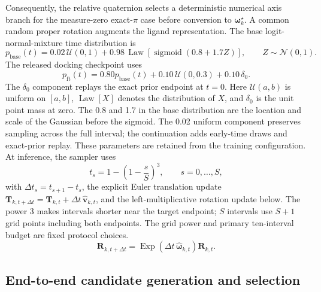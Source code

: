 \documentclass{article}
\renewcommand{\boldsymbol}[1]{\pmb{#1}}
\begin{document}
Consequently, the relative quaternion selects a deterministic numerical axis branch for the measure-zero exact-\(\pi\) case before conversion to \(\boldsymbol{\omega}^{\star}_k\).
A common random proper rotation augments the ligand representation.
The base logit-normal-mixture time distribution is
\begin{equation}
    p_{\mathrm{base}}(t)
    =0.02\,\mathcal{U}(0,1)
    +0.98\,\operatorname{Law}
      [\operatorname{sigmoid}(0.8+1.7Z)],
    \qquad Z\sim\mathcal{N}(0,1).
    \label{eq:si_time_distribution_base}
\end{equation}
The released docking checkpoint uses
\begin{equation}
    p_{\mathrm{ft}}(t)
    =0.80p_{\mathrm{base}}(t)
     +0.10\,\mathcal{U}(0,0.3)
     +0.10\,\delta_0.
    \label{eq:si_time_distribution}
\end{equation}
The \(\delta_0\) component replays the exact prior endpoint at \(t=0\).
Here \(\mathcal U(a,b)\) is uniform on \([a,b]\), \(\operatorname{Law}[X]\) denotes the distribution of \(X\), and \(\delta_0\) is the unit point mass at zero.
The 0.8 and 1.7 in the base distribution are the location and scale of the Gaussian before the sigmoid. The 0.02 uniform component preserves sampling across the full interval; the continuation adds early-time draws and exact-prior replay. These parameters are retained from the training configuration.
At inference, the sampler uses
\begin{equation}
    t_s=1-\left(1-\frac{s}{S}\right)^3,
    \qquad s=0,\ldots,S,
    \label{eq:si_time_grid}
\end{equation}
with \(\Delta t_s=t_{s+1}-t_s\), the explicit Euler translation update \(\mathbf T_{k,t+\Delta t}=\mathbf T_{k,t}+\Delta t\,\widehat{\mathbf v}_{k,t}\), and the left-multiplicative rotation update below.
The power 3 makes intervals shorter near the target endpoint; \(S\) intervals use \(S+1\) grid points including both endpoints. The grid power and primary ten-interval budget are fixed protocol choices.
\begin{equation}
    \mathbf{R}_{k,t+\Delta t}
    =
    \operatorname{Exp}(\Delta t\,\widehat{\boldsymbol{\omega}}_{k,t})
    \mathbf{R}_{k,t}.
    \label{eq:si_rotation_update}
\end{equation}

\subsection{End-to-end candidate generation and selection}
\end{document}
